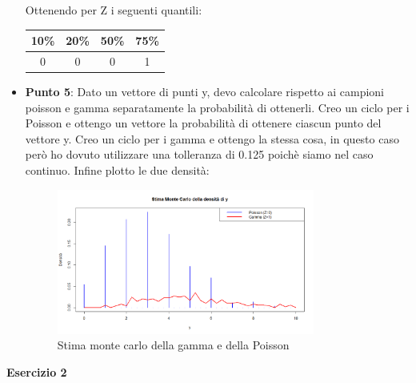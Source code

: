 \documentclass[a4paper,12pt]{article}
\begin{document}
\begin{itemize}
		Ottenendo per Z i seguenti quantili:\newline
	\begin{tabular}{|c|c|c|c|}
		\hline
		10\% & 20\% & 50\% & 75\% \\
		\hline
		0 & 0 & 0 & 1 \\
		\hline
	\end{tabular}
	\item \textbf{Punto 5}: Dato un vettore di punti y, devo calcolare rispetto ai campioni poisson e gamma separatamente la probabilità di ottenerli. Creo un ciclo per i Poisson e ottengo un vettore la probabilità di ottenere ciascun punto del vettore y. Creo un ciclo per i gamma e ottengo la stessa cosa, in questo caso però ho dovuto utilizzare una tolleranza di 0.125 poichè siamo nel caso continuo. Infine plotto le due densità:
	\begin{figure}[h] %
		\centering %
		\includegraphics[width=0.8\textwidth]{doppiadens.png} %
		\caption{Stima monte carlo della gamma e della Poisson} %
		\label{fig:immagine} %
	\end{figure}	
\end{itemize}
\newpage
\centering \textbf{Esercizio 2}\\
\end{document}
